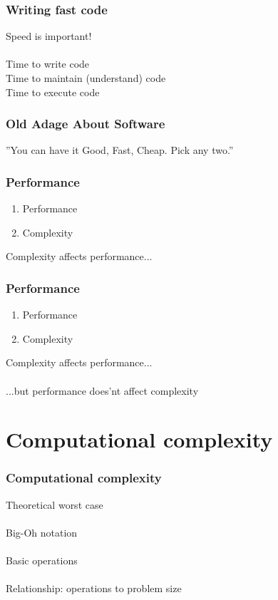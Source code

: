 \documentclass{beamer}
\begin{document}
\begin{frame}
	\frametitle{Writing fast code}
	\begin{center}
		Speed is important! \\~\\
		Time to write code \\
		Time to maintain (understand) code \\
		Time to execute code
	\end{center}
\end{frame}

\begin{frame}
	\frametitle{Old Adage About Software}
	\begin{center}
		''You can have it Good, Fast, Cheap. Pick any two.''
	\end{center}
\end{frame}

\begin{frame}
	\frametitle{Performance}
	\begin{center}
		\begin{enumerate}
			\item Performance
			\item Complexity
		\end{enumerate}
		\bigskip
		Complexity affects performance...
	\end{center}
\end{frame}

\begin{frame}
	\frametitle{Performance}
	\begin{center}
		\begin{enumerate}
			\item Performance
			\item Complexity
		\end{enumerate}
		\bigskip
		Complexity affects performance... \\~\\
		...but performance does'nt affect complexity
	\end{center}
\end{frame}

\section{Computational complexity}

\begin{frame}
	\frametitle{Computational complexity}
	\begin{center}
		Theoretical worst case \\~\\
		
		Big-Oh notation \\~\\
		
		Basic operations \\~\\
		
		Relationship: operations to problem size \\~\\
	\end{center}
\end{frame}
\end{document}
